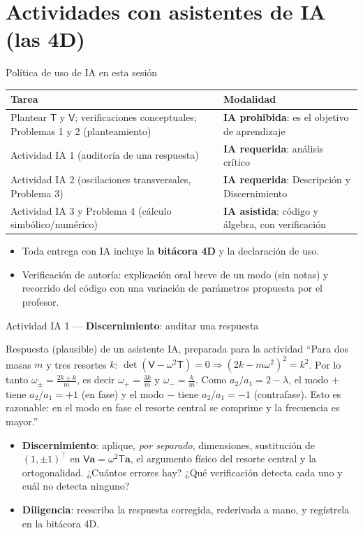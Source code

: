\documentclass[spanish,10pt]{beamer}
\newcommand{\Tm}{\mathsf{T}}                 %
\newcommand{\Vm}{\mathsf{V}}                 %
\newcommand{\tr}{^{\top}}                    %
\newcommand{\Disc}{\textcolor{cdisc}{\textbf{Discernimiento}}}
\newcommand{\Dili}{\textcolor{cdili}{\textbf{Diligencia}}}
\begin{document}
\section{Actividades con asistentes de IA (las 4D)}
\begin{frame}{Política de uso de IA en esta sesión}
\small
\begin{tabularx}{\textwidth}{@{}>{\raggedright\arraybackslash}p{} >{\raggedright\arraybackslash}X@{}}
\toprule
\textbf{Tarea} & \textbf{Modalidad} \\
\midrule
Plantear $\Tm$ y $\Vm$; verificaciones conceptuales; Problemas 1 y 2 (planteamiento) & \textbf{IA prohibida}: es el objetivo de aprendizaje \\
Actividad IA 1 (auditoría de una respuesta) & \textbf{IA requerida}: análisis crítico \\
Actividad IA 2 (oscilaciones transversales, Problema 3) & \textbf{IA requerida}: Descripción y Discernimiento \\
Actividad IA 3 y Problema 4 (cálculo simbólico/numérico) & \textbf{IA asistida}: código y álgebra, con verificación \\
\bottomrule
\end{tabularx}
\vspace{1ex}
\begin{itemize}
  \item Toda entrega con IA incluye la \textbf{bitácora 4D} y la declaración de uso.
  \item Verificación de autoría: explicación oral breve de un modo (sin notas) y recorrido del código con una variación de parámetros propuesta por el profesor.
\end{itemize}
\end{frame}

\begin{frame}{Actividad IA 1 — \Disc: auditar una respuesta}
\begin{block}{Respuesta (plausible) de un asistente IA, preparada para la actividad}
\small
“Para dos masas $m$ y tres resortes $k$: $\det(\Vm-\omega^2\Tm)=0\Rightarrow(2k-m\omega^2)^2=k^2$.
Por lo tanto $\omega_\pm=\frac{2k\pm k}{m}$, es decir $\omega_+=\frac{3k}{m}$ y $\omega_-=\frac{k}{m}$.
Como $a_2/a_1=2-\lambda$, el modo $+$ tiene $a_2/a_1=+1$ (en fase) y el modo $-$ tiene $a_2/a_1=-1$ (contrafase).
Esto es razonable: en el modo en fase el resorte central se comprime y la frecuencia es mayor.”
\end{block}
\begin{itemize}
  \item \Disc: aplique, \emph{por separado}, dimensiones, sustitución de $(1,\pm1)\tr$ en $\Vm\mathbf a=\omega^2\Tm\mathbf a$, el argumento físico del resorte central y la ortogonalidad. ¿Cuántos errores hay? ¿Qué verificación detecta cada uno y cuál no detecta ninguno?
  \item \Dili: reescriba la respuesta corregida, rederivada a mano, y regístrela en la bitácora 4D.
\end{itemize}
\end{frame}
\end{document}
